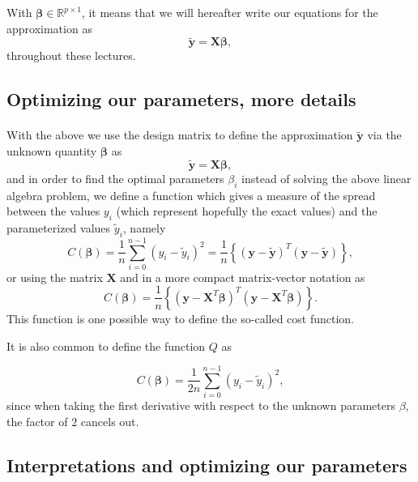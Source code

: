 \documentclass[%
oneside,                 %
final,                   %
10pt]{article}
\begin{document}
With $\bm{\beta}\in {\mathbb{R}}^{p\times 1}$, it means that we will hereafter write our equations for the approximation as
\[
\bm{\tilde{y}}= \bm{X}\bm{\beta},
\]
throughout these lectures. 


\subsection*{Optimizing our parameters, more details}

\paragraph{}
With the above we use the design matrix to define the approximation $\bm{\tilde{y}}$ via the unknown quantity $\bm{\beta}$ as
\[
\bm{\tilde{y}}= \bm{X}\bm{\beta},
\]
and in order to find the optimal parameters $\beta_i$ instead of solving the above linear algebra problem, we define a function which gives a measure of the spread between the values $y_i$ (which represent hopefully the exact values) and the parameterized values $\tilde{y}_i$, namely
\[
C(\bm{\beta})=\frac{1}{n}\sum_{i=0}^{n-1}\left(y_i-\tilde{y}_i\right)^2=\frac{1}{n}\left\{\left(\bm{y}-\bm{\tilde{y}}\right)^T\left(\bm{y}-\bm{\tilde{y}}\right)\right\},
\]
or using the matrix $\bm{X}$ and in a more compact matrix-vector notation as
\[
C(\bm{\beta})=\frac{1}{n}\left\{\left(\bm{y}-\bm{X}^T\bm{\beta}\right)^T\left(\bm{y}-\bm{X}^T\bm{\beta}\right)\right\}.
\]
This function is one possible way to define the so-called cost function.



It is also common to define
the function $Q$ as

\[
C(\bm{\beta})=\frac{1}{2n}\sum_{i=0}^{n-1}\left(y_i-\tilde{y}_i\right)^2,
\]
since when taking the first derivative with respect to the unknown parameters $\beta$, the factor of $2$ cancels out.




\subsection*{Interpretations and optimizing our parameters}

\paragraph{}
\end{document}
